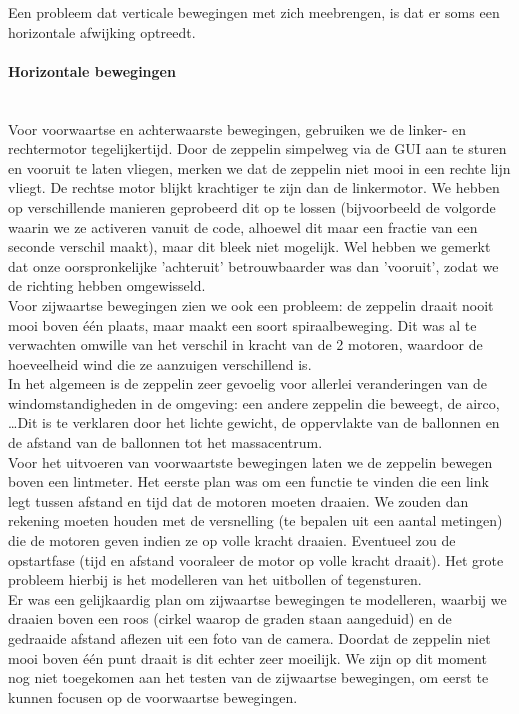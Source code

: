 \documentclass[eind]{penoverslag}
\begin{document}
Een probleem dat verticale bewegingen met zich meebrengen, is dat er soms een horizontale afwijking optreedt.

\paragraph{Horizontale bewegingen} ~\\ 
Voor voorwaartse en achterwaarste bewegingen, gebruiken we de linker- en rechtermotor tegelijkertijd. Door de zeppelin simpelweg via de GUI aan te sturen en vooruit te laten vliegen, merken we dat de zeppelin niet mooi in een rechte lijn vliegt. De rechtse motor blijkt krachtiger te zijn dan de linkermotor. We hebben op verschillende manieren geprobeerd dit op te lossen (bijvoorbeeld de volgorde waarin we ze activeren vanuit de code, alhoewel dit maar een fractie van een seconde verschil maakt), maar dit bleek niet mogelijk. Wel hebben we gemerkt dat onze oorspronkelijke 'achteruit' betrouwbaarder was dan 'vooruit', zodat we de richting hebben omgewisseld. \\

Voor zijwaartse bewegingen zien we ook een probleem: de zeppelin draait nooit mooi boven \'e\'en plaats, maar maakt een soort spiraalbeweging. Dit was al te verwachten omwille van het verschil in kracht van de 2 motoren, waardoor de hoeveelheid wind die ze aanzuigen verschillend is. \\

In het algemeen is de zeppelin zeer gevoelig voor allerlei veranderingen van de windomstandigheden in de omgeving: een andere zeppelin die beweegt, de airco, \ldots Dit is te verklaren door het lichte gewicht, de oppervlakte van de ballonnen en de afstand van de ballonnen tot het massacentrum. \\

Voor het uitvoeren van voorwaartste bewegingen laten we de zeppelin bewegen boven een lintmeter. Het eerste plan was om een functie te vinden die een link legt tussen afstand en tijd dat de motoren moeten draaien. We zouden dan rekening moeten houden met de versnelling (te bepalen uit een aantal metingen) die de motoren geven indien ze op volle kracht draaien. Eventueel zou de opstartfase (tijd en afstand vooraleer de motor op volle kracht draait). Het grote probleem hierbij is het modelleren van het uitbollen of tegensturen. \\

Er was een gelijkaardig plan om zijwaartse bewegingen te modelleren, waarbij we draaien boven een roos (cirkel waarop de graden staan aangeduid) en de gedraaide afstand aflezen uit een foto van de camera. Doordat de zeppelin niet mooi boven \'e\'en punt draait is dit echter zeer moeilijk. We zijn op dit moment nog niet toegekomen aan het testen van de zijwaartse bewegingen, om eerst te kunnen focusen op de voorwaartse bewegingen.
\end{document}

